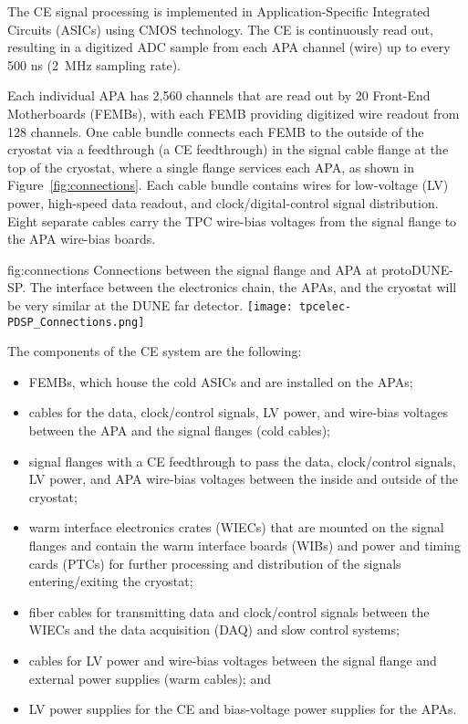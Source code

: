 
The CE signal processing is implemented in Application-Specific Integrated Circuits (ASICs)
using CMOS technology.  The CE is continuously read out, resulting in a digitized ADC
sample from each APA channel (wire) up to every 500 ns (2~MHz sampling rate).

Each individual APA has 2,560 channels that are read out by 20 Front-End Motherboards (FEMBs), with
each FEMB providing digitized wire readout from 128 channels.  One cable bundle connects each FEMB to
the outside of the cryostat via a feedthrough (a CE feedthrough) in the signal cable flange at the
top of the cryostat, where a single flange services each APA, as shown in Figure~\ref{fig:connections}.
Each cable bundle contains wires for low-voltage (LV) power, high-speed data readout, and
clock/digital-control signal distribution.  Eight separate cables carry the TPC wire-bias voltages
from the signal flange to the APA wire-bias boards.

\begin{dunefigure}
{fig:connections}
{Connections between the signal flange and APA at protoDUNE-SP.  The interface between the electronics chain, the APAs, and the cryostat will be very similar at the DUNE far detector.}
\texttt{[image: tpcelec-PDSP\_Connections.png]}
\end{dunefigure}

The components of the CE system are the following:
\begin{itemize}
\item{FEMBs, which house the cold ASICs and are installed on the
APAs;}
\item{cables for the data, clock/control signals, LV power, and wire-bias voltages between the APA and the signal flanges (cold cables);}
\item{signal flanges with a CE feedthrough to pass the data, clock/control signals, LV power, and APA wire-bias voltages between the inside and outside of the cryostat;}
\item{warm interface electronics crates (WIECs) that are mounted on the signal flanges and contain
the warm interface boards (WIBs) and power and timing cards (PTCs) for further processing
and distribution of the signals entering/exiting the cryostat;}
\item{fiber cables for transmitting data and clock/control signals between the WIECs and the
data acquisition (DAQ) and slow control systems;}
\item{cables for LV power and wire-bias voltages between the signal flange and external power
supplies (warm cables); and}
\item{LV power supplies for the CE and bias-voltage power supplies for the APAs.}
\end{itemize}

